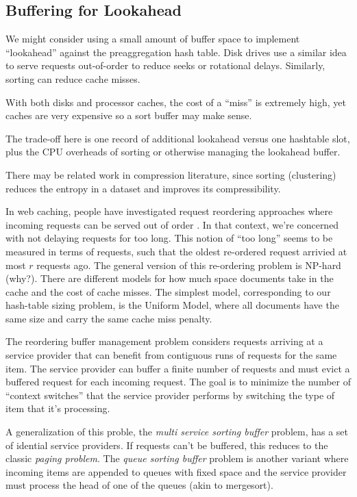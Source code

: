 \documentclass[12pt]{article}
\begin{document}
\subsection{Buffering for Lookahead}

We might consider using a small amount of buffer space to implement ``lookahead'' against the preaggregation hash table.
Disk drives use a similar idea to serve requests out-of-order to reduce seeks or rotational delays.
Similarly, sorting can reduce cache misses.

With both disks and processor caches, the cost of a ``miss'' is extremely high, yet caches are very expensive so a sort buffer may make sense.

The trade-off here is one record of additional lookahead versus one hashtable slot, plus the CPU overheads of sorting or otherwise managing the lookahead buffer.

There may be related work in compression literature, since sorting (clustering) reduces the entropy in a dataset and improves its compressibility.

In web caching, people have investigated request reordering approaches where incoming requests can be served out of order \cite{web-caching-new-results}.  In that context, we're concerned with not delaying requests for too long.  This notion of ``too long'' seems to be measured in terms of requests, such that the oldest re-ordered request arrivied at most $r$ requests ago.  The general version of this re-ordering problem is NP-hard (why?).  There are different models for how much space documents take in the cache and the cost of cache misses.  The simplest model, corresponding to our hash-table sizing problem, is the Uniform Model, where all documents have the same size and carry the same cache miss penalty.

The reordering buffer management problem \cite{online-scheduling-for-sorting-buffers} considers requests arriving at a service provider that can benefit from contiguous runs of requests for the same item.  The service provider can buffer a finite number of requests and must evict a buffered request for each incoming request.  The goal is to minimize the number of ``context switches'' that the service provider performs by switching the type of item that it's processing.

A generalization of this proble, the \emph{multi service sorting buffer} problem, has a set of idential service providers.  If requests can't be buffered, this reduces to the classic \emph{paging problem}.  The \emph{queue sorting buffer} problem is another variant where incoming items are appended to queues with fixed space and the service provider must process the head of one of the queues (akin to mergesort).
\end{document}
